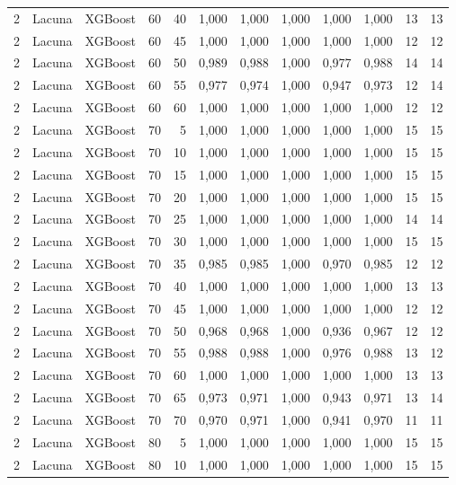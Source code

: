 \begin{longtable}{@{}rllrrrrrrrrr@{}}
2 & Lacuna & XGBoost & 60 & 40 & 1,000 & 1,000 & 1,000 & 1,000 & 1,000 & 13 & 13 \\
2 & Lacuna & XGBoost & 60 & 45 & 1,000 & 1,000 & 1,000 & 1,000 & 1,000 & 12 & 12 \\
2 & Lacuna & XGBoost & 60 & 50 & 0,989 & 0,988 & 1,000 & 0,977 & 0,988 & 14 & 14 \\
2 & Lacuna & XGBoost & 60 & 55 & 0,977 & 0,974 & 1,000 & 0,947 & 0,973 & 12 & 14 \\
2 & Lacuna & XGBoost & 60 & 60 & 1,000 & 1,000 & 1,000 & 1,000 & 1,000 & 12 & 12 \\
2 & Lacuna & XGBoost & 70 & 5 & 1,000 & 1,000 & 1,000 & 1,000 & 1,000 & 15 & 15 \\
2 & Lacuna & XGBoost & 70 & 10 & 1,000 & 1,000 & 1,000 & 1,000 & 1,000 & 15 & 15 \\
2 & Lacuna & XGBoost & 70 & 15 & 1,000 & 1,000 & 1,000 & 1,000 & 1,000 & 15 & 15 \\
2 & Lacuna & XGBoost & 70 & 20 & 1,000 & 1,000 & 1,000 & 1,000 & 1,000 & 15 & 15 \\
2 & Lacuna & XGBoost & 70 & 25 & 1,000 & 1,000 & 1,000 & 1,000 & 1,000 & 14 & 14 \\
2 & Lacuna & XGBoost & 70 & 30 & 1,000 & 1,000 & 1,000 & 1,000 & 1,000 & 15 & 15 \\
2 & Lacuna & XGBoost & 70 & 35 & 0,985 & 0,985 & 1,000 & 0,970 & 0,985 & 12 & 12 \\
2 & Lacuna & XGBoost & 70 & 40 & 1,000 & 1,000 & 1,000 & 1,000 & 1,000 & 13 & 13 \\
2 & Lacuna & XGBoost & 70 & 45 & 1,000 & 1,000 & 1,000 & 1,000 & 1,000 & 12 & 12 \\
2 & Lacuna & XGBoost & 70 & 50 & 0,968 & 0,968 & 1,000 & 0,936 & 0,967 & 12 & 12 \\
2 & Lacuna & XGBoost & 70 & 55 & 0,988 & 0,988 & 1,000 & 0,976 & 0,988 & 13 & 12 \\
2 & Lacuna & XGBoost & 70 & 60 & 1,000 & 1,000 & 1,000 & 1,000 & 1,000 & 13 & 13 \\
2 & Lacuna & XGBoost & 70 & 65 & 0,973 & 0,971 & 1,000 & 0,943 & 0,971 & 13 & 14 \\
2 & Lacuna & XGBoost & 70 & 70 & 0,970 & 0,971 & 1,000 & 0,941 & 0,970 & 11 & 11 \\
2 & Lacuna & XGBoost & 80 & 5 & 1,000 & 1,000 & 1,000 & 1,000 & 1,000 & 15 & 15 \\
2 & Lacuna & XGBoost & 80 & 10 & 1,000 & 1,000 & 1,000 & 1,000 & 1,000 & 15 & 15 \\

\end{longtable}
